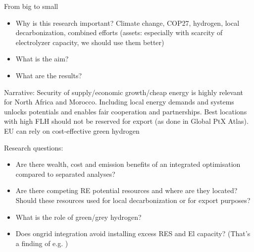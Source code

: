 From big to small
\begin{itemize}
    \item Why is this research important? Climate change, COP27, hydrogen, local decarbonization, combined efforts (assets: especially with scarcity of electrolyzer capacity, we should use them better)
    \item What is the aim?
    \item What are the results?
\end{itemize}
Narrative: 
Security of supply/economic growth/cheap energy is highly relevant for North Africa and Morocco. 
Including local energy demands and systems unlocks potentials and enables fair cooperation and partnerships.
Best locations with high FLH should not be reserved for export (as done in Global PtX Atlas). 
EU can rely on cost-effective green hydrogen

Research questions:
\begin{itemize}
    \item Are there wealth, cost and emission benefits of an integrated optimisation compared to separated analyses?
    \item Are there competing RE potential resources and where are they located? Should these resources used for local decarbonization or for export purposes?
    \item What is the role of green/grey hydrogen?   
    \item Does ongrid integration avoid installing excess RES and El capacity? (That's a finding of e.g. \cite{Ruhnau2022})
\end{itemize}
